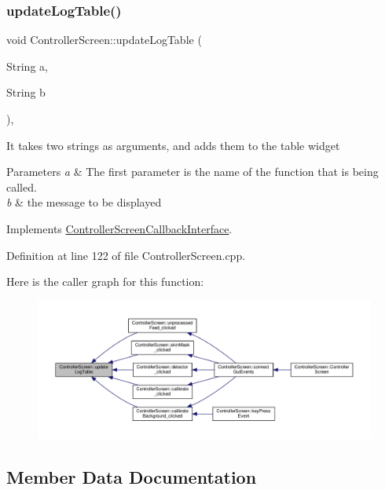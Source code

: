 \subsubsection{\texorpdfstring{update\+Log\+Table()}{updateLogTable()}}
{\footnotesize\ttfamily void Controller\+Screen\+::update\+Log\+Table (\begin{DoxyParamCaption}\item[{String}]{a,  }\item[{String}]{b }\end{DoxyParamCaption})\hspace{0.3cm}{\ttfamily [override]}, {\ttfamily [virtual]}}

It takes two strings as arguments, and adds them to the table widget


\begin{DoxyParams}{Parameters}
{\em a} & The first parameter is the name of the function that is being called. \\
\hline
{\em b} & the message to be displayed \\
\hline
\end{DoxyParams}


Implements \hyperlink{class_controller_screen_callback_interface_af92ab0514459c690e357064676fa33f0}{Controller\+Screen\+Callback\+Interface}.



Definition at line 122 of file Controller\+Screen.\+cpp.

Here is the caller graph for this function\+:
\nopagebreak
\begin{figure}[H]
\begin{center}
\leavevmode
\includegraphics[width=350pt]{class_controller_screen_a039b816adc94fc7e7757520c10fd1d0b_icgraph}
\end{center}
\end{figure}


\subsection{Member Data Documentation}
\mbox{\label{class_controller_screen_a672477c37c55499b69e28da611e7313d}} 
